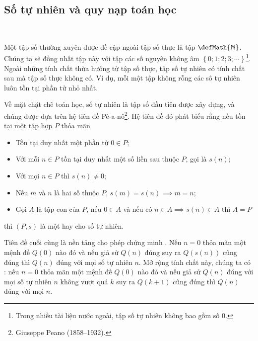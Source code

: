 \subsection{Số tự nhiên và quy nạp toán học}

\ %

Một tập số thường xuyên được đề cập ngoài tập số thực là tập  $\defMath{\mathbb{N}}$. Chúng ta sẽ đồng nhất tập này với tập các số nguyên không âm $\left\{0; 1; 2; 3; \cdots\right\}$\footnote{Trong nhiều tài liệu nước ngoài, tập số tự nhiên không bao gồm số $0$.}. Ngoài những tính chất thừa hưởng từ tập số thực, tập số tự nhiên có tính chất sau mà tập số thực không có. Ví dụ, mỗi một tập không rỗng các sô tự nhiên luôn tồn tại phần tử nhỏ nhất.

Về mặt chặt chẽ toán học, số tự nhiên là tập số đầu tiên được xây dựng, và chúng được dựa trên hệ tiên đề Pê-a-nô\footnote{Giuseppe Peano (1858–1932).}. Hệ tiên đề đó phát biểu rằng nếu tồn tại một tập hợp $P$ thỏa mãn
\begin{itemize}
   \item Tồn tại duy nhất một phần tử $0 \in P$;
   \item Với mỗi $n \in P$ tồn tại duy nhất một số liền sau thuộc $P$, gọi là $s(n)$;
   \item Với mọi $n \in P$ thì $s(n) \neq 0$;
   \item Nếu $m$ và $n$ là hai số thuộc $P$, $s(m) = s(n) \implies m = n$;
   \item Gọi $A$ là tập con của $P$, nếu $0 \in A$ và nếu có $n\in A \implies s(n) \in A$ thì $A = P$
\end{itemize}
thì $(P, s)$ là một  hay  cho số tự nhiên.

Tiên đề cuối cùng là nền tảng cho phép chứng minh . Nếu $n = 0$ thỏa mãn một mệnh đề $Q(0)$ nào đó và nếu giả sử $Q(n)$ đúng suy ra $Q(s(n))$ cũng đúng thì $Q(n)$ đúng với mọi số tự nhiên $n$. Mở rộng tính chất này, chúng ta có : nếu $n = 0$ thỏa mãn một mệnh đề $Q(0)$ nào đó và nếu giả sử $Q(n)$ đúng với mọi số tự nhiên $n$ không vượt quá $k$ suy ra $Q(k+1)$ cũng đúng thì $Q(n)$ đúng với mọi $n$.